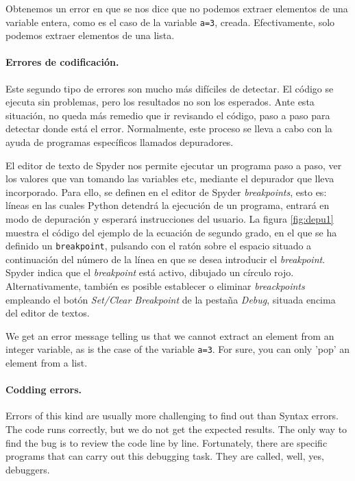 \begin{paracol}{2}
Obtenemos un error en que se nos dice que no podemos extraer elementos de una variable entera, como es el caso de la variable \texttt{a=3}, creada. Efectivamente, solo podemos extraer elementos de una lista.

\paragraph{Errores de codificación.} Este segundo tipo de errores son mucho más difíciles de detectar. El código se ejecuta sin problemas, pero los resultados no son los esperados. Ante esta situación, no queda más remedio que ir revisando el código, paso a paso para detectar donde está el error. Normalmente, este proceso se lleva a cabo con la ayuda de programas específicos llamados depuradores.

El editor de texto de Spyder nos permite ejecutar un programa paso a paso, ver los valores que van tomando las variables etc, mediante el depurador que lleva incorporado. Para ello, se definen en el editor de Spyder \emph{breakpoints}, esto es: líneas en las cuales Python detendrá la ejecución de un programa, entrará en modo de depuración y esperará instrucciones del usuario. La figura \ref{fig:depu1} muestra el código del ejemplo de la ecuación de segundo grado, en el que se ha definido un \texttt{breakpoint}, pulsando con el ratón sobre el espacio situado a continuación del número de la línea en que se desea  introducir el \emph{breakpoint}.  Spyder indica que el \emph{breakpoint} está activo, dibujado un círculo rojo. Alternativamente, también es posible establecer o eliminar \emph{breackpoints} empleando el botón \emph{Set/Clear Breakpoint} de la pestaña \emph{Debug}, situada encima del editor de textos.

\switchcolumn
We get an error message telling us that we cannot extract an element from an integer variable, as is the case of the variable \texttt{a=3}. For sure, you can only 'pop' an element from a list.

\paragraph{Codding errors.} Errors of this kind are usu\-ally more challenging to find out than Syntax errors. The code runs correctly, but we do not get the expected results. The only way to find the bug is to review the code line by line. Fortunately, there are specific programs that can carry out this debugging task. They are called, well, yes, debuggers.


\end{paracol}
